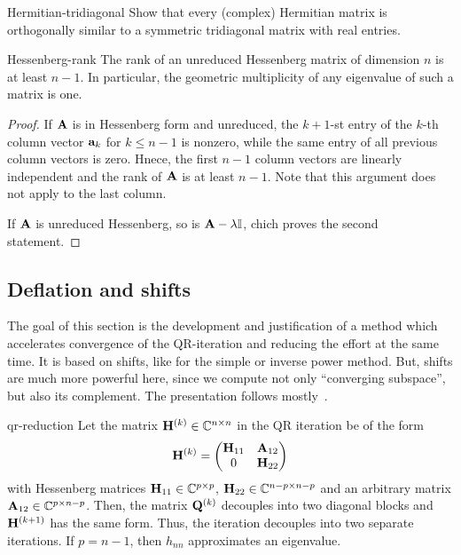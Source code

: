 \begin{Problem}{Hermitian-tridiagonal}
  Show that every (complex) Hermitian matrix is orthogonally similar
  to a symmetric tridiagonal matrix with real entries.
\end{Problem}

\begin{Lemma}{Hessenberg-rank}
  The rank of an unreduced Hessenberg matrix of dimension $n$ is at
  least $n-1$. In particular, the geometric multiplicity of any
  eigenvalue of such a matrix is one.
\end{Lemma}

\begin{proof}
  If $\mathbf A$ is in Hessenberg form and unreduced, the $k+1$-st entry
  of the $k$-th column vector $\mathbf a_k$ for $k\le n-1$ is nonzero, while
  the same entry of all previous column vectors is zero. Hnece, the
  first $n-1$ column vectors are linearly independent and the rank of
  $\mathbf A$ is at least $n-1$. Note that this argument does not apply to
  the last column.

  If $\mathbf A$ is unreduced Hessenberg, so is $\mathbf A-\lambda\mathbb I$, chich
  proves the second statement.
\end{proof}

\subsection{Deflation and shifts}

\begin{intro}
  The goal of this section is the development and justification of a
  method which accelerates convergence of the QR-iteration and
  reducing the effort at the same time. It is based on shifts, like
  for the simple or inverse power method. But, shifts are much more
  powerful here, since we compute not only ``converging subspace'',
  but also its complement. The presentation follows
  mostly~\cite{GolubVanLoan83}.
\end{intro}

\begin{Theorem}{qr-reduction}
  Let the matrix $\mathbf H^{(k)}\in\mathbb C^{n\times n}$ in the QR iteration be of the
  form
  \begin{gather}
    \mathbf H^{(k)} =
    \begin{pmatrix}
      \mathbf H_{11} & \mathbf A_{12}\\0 & \mathbf H_{22}
    \end{pmatrix}
  \end{gather}
  with Hessenberg matrices $\mathbf H_{11}\in\mathbb C^{p\times p}$,
  $\mathbf H_{22}\in \mathbb C^{n-p\times n-p}$ and an arbitrary matrix
  $\mathbf A_{12}\in \mathbb C^{p\times n-p}$. Then, the matrix $\mathbf Q^{(k)}$
  decouples into two diagonal blocks and $\mathbf H^{(k+1)}$ has the same
  form. Thus, the iteration decouples into two separate iterations. If
  $p=n-1$, then $h_{nn}$ approximates an eigenvalue.
\end{Theorem}

